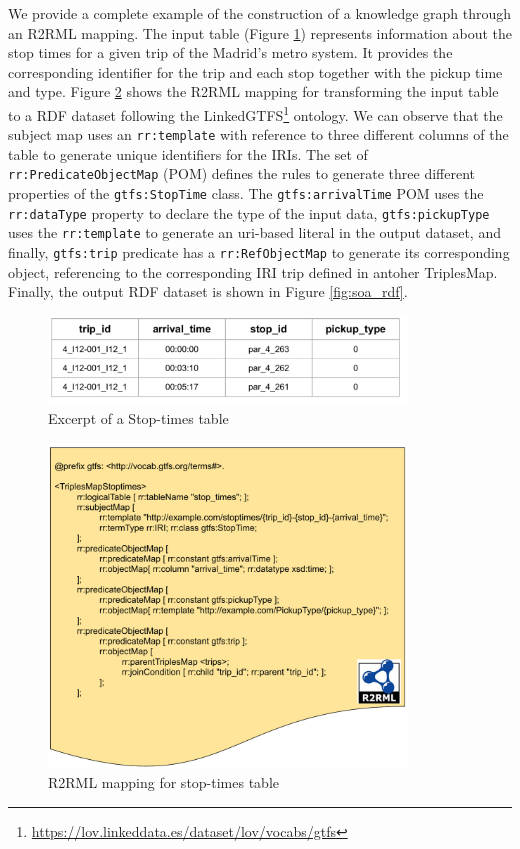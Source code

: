 We provide a complete example of the construction of a knowledge graph through an R2RML mapping. The input table (Figure \ref{fig:soa_csv}) represents information about the stop times for a given trip of the Madrid's metro system. It provides the corresponding identifier for the trip and each stop together with the pickup time and type. Figure \ref{fig:soa_r2rml} shows the R2RML mapping for transforming the input table to a RDF dataset following the LinkedGTFS\footnote{\url{https://lov.linkeddata.es/dataset/lov/vocabs/gtfs}} ontology. We can observe that the subject map uses an \texttt{rr:template} with reference to three different columns of the table to generate unique identifiers for the IRIs. The set of \texttt{rr:PredicateObjectMap} (POM) defines the rules to generate three different properties of the \texttt{gtfs:StopTime} class. The \texttt{gtfs:arrivalTime} POM uses the \texttt{rr:dataType} property to declare the type of the input data, \texttt{gtfs:pickupType} uses the \texttt{rr:template} to generate an uri-based literal in the output dataset, and finally, \texttt{gtfs:trip} predicate has a \texttt{rr:RefObjectMap} to generate its corresponding object, referencing to the corresponding IRI trip defined in antoher TriplesMap. Finally, the output RDF dataset is shown in Figure \ref{fig:soa_rdf}.

\begin{figure}[!t]
\centering
\includegraphics[width=0.85\textwidth]{figures/state-of-the-art/Stop_times CSV.pdf}
\caption{Excerpt of a Stop-times table}
\label{fig:soa_csv}
\end{figure}

\begin{figure}[!ht]
\centering
\includegraphics[width=0.85\textwidth]{figures/state-of-the-art/R2RML-example.pdf}
\caption{R2RML mapping for stop-times table}
\label{fig:soa_r2rml}
\end{figure}


